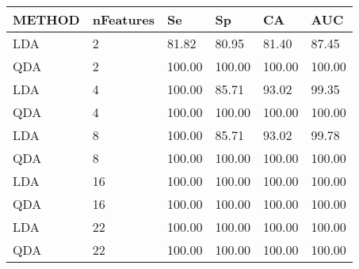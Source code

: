 \begin{table}[!ht]
    \centering
    \begin{tabular}{llllll}
    \hline
        METHOD & nFeatures & Se & Sp & CA & AUC \\ \hline
        LDA & 2 & 81.82 & 80.95 & 81.40 & 87.45 \\ 
        QDA & 2 & 100.00 & 100.00 & 100.00 & 100.00 \\ 
        LDA & 4 & 100.00 & 85.71 & 93.02 & 99.35 \\ 
        QDA & 4 & 100.00 & 100.00 & 100.00 & 100.00 \\ 
        LDA & 8 & 100.00 & 85.71 & 93.02 & 99.78 \\ 
        QDA & 8 & 100.00 & 100.00 & 100.00 & 100.00 \\ 
        LDA & 16 & 100.00 & 100.00 & 100.00 & 100.00 \\ 
        QDA & 16 & 100.00 & 100.00 & 100.00 & 100.00 \\ 
        LDA & 22 & 100.00 & 100.00 & 100.00 & 100.00 \\ 
        QDA & 22 & 100.00 & 100.00 & 100.00 & 100.00 \\ 
    \end{tabular}
\end{table}
